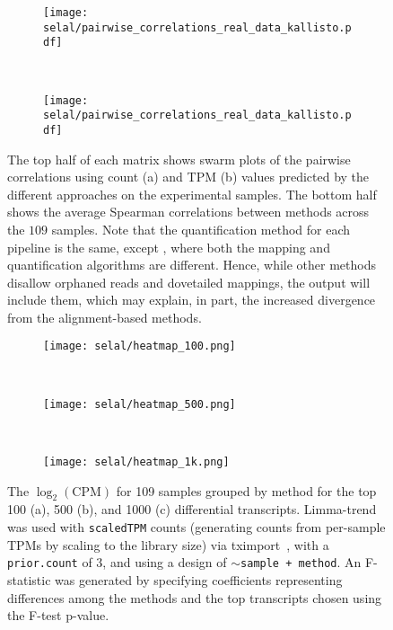 \begin{figure}[h!]
    \centering
    \begin{subfigure}[t]{0.7\textwidth}
        \centering
  	  	 \texttt{[image: selal/pairwise\_correlations\_real\_data\_kallisto.pdf]}
		\caption{}
    \end{subfigure}
    ~ 
    \begin{subfigure}[t]{0.7\textwidth}
        \centering
  	  	\texttt{[image: selal/pairwise\_correlations\_real\_data\_kallisto.pdf]}
		\caption{}
    \end{subfigure}
    \caption{The top half of each matrix shows swarm plots of the pairwise correlations using count (a) and TPM (b) values
        predicted by the different approaches on the experimental samples. The
        bottom half shows the average Spearman correlations between methods
        across the $109$ samples. Note that the quantification method for each
        pipeline is the same, except \kallisto, where both the mapping and
        quantification algorithms are different. Hence, while other methods
        disallow orphaned reads and dovetailed mappings, the \kallisto output
        will include them, which may explain, in part, the increased divergence
        from the alignment-based methods.}
    \label{fig:kallisto}
\end{figure}

\begin{figure}[t!]
    \centering
    \begin{subfigure}[t]{0.45\textwidth}
        \centering
	    \texttt{[image: selal/heatmap\_100.png]}
	    \caption{}
    \end{subfigure}
    ~
    \begin{subfigure}[t]{0.45\textwidth}
        \centering
	    \texttt{[image: selal/heatmap\_500.png]}
	    \caption{}
    \end{subfigure}
    ~
     \begin{subfigure}[t]{0.45\textwidth}
     \centering
	    \texttt{[image: selal/heatmap\_1k.png]}
	    \caption{}
    \end{subfigure}
    \caption{The $\log_2(\text{CPM})$ for 109 samples grouped by
      method for the top 100 (a), 500 (b), and 1000 (c) differential transcripts. 
      Limma-trend was used with \texttt{scaledTPM} counts 
	(generating counts from per-sample TPMs by scaling to the library size) via
	tximport~\cite{soneson2015differential}, with a \texttt{prior.count} of
	3, and using a design of \texttt{$\sim$sample + method}. An F-statistic was
	generated by specifying coefficients representing differences among the methods
	and the top transcripts chosen using the F-test p-value.}
      \label{fig:heatmap}
\end{figure}

